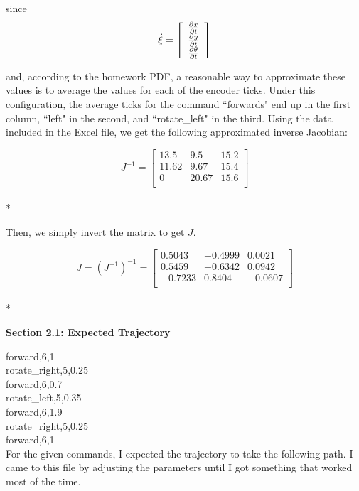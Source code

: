 \documentclass{article}
\begin{document}
since 
$$ \dot{\xi} = 
\left[\begin{array}{c}
\frac{\partial x}{\partial t} \\
\frac{\partial y}{\partial t} \\
\frac{\partial \theta}{\partial t} 
\end{array}\right] \\* 
$$

and, according to the homework PDF, a reasonable way to approximate these values is to average the values for each of the encoder ticks. Under this configuration, the average ticks for the command ``forwards" end up in the first column, ``left" in the second, and ``rotate\_left" in the third. Using the data included in the Excel file, we get the following approximated inverse Jacobian:

$$J^{-1} =
\left[\begin{array}{ccc}
13.5 & 9.5 & 15.2\\
11.62 & 9.67 & 15.4\\
0 & 20.67 & 15.6\\
\end{array}\right]$$ \\*

Then, we simply invert the matrix to get $J$.

\vspace{4mm}
$$J = (J^{-1})^{-1} =
\left[\begin{array}{ccc}
0.5043 & -0.4999 & 0.0021\\
0.5459 & -0.6342 & 0.0942\\
-0.7233 & 0.8404 & -0.0607\\
\end{array}\right]$$ \\*


\vspace{8mm}
\bf Section 2.1: Expected Trajectory \rm
\vspace{4mm}

forward,6,1\\
rotate\_right,5,0.25\\
forward,6,0.7\\
rotate\_left,5,0.35\\
forward,6,1.9\\
rotate\_right,5,0.25\\
forward,6,1\\

For the given commands, I expected the trajectory to take the following path. I came to this file by adjusting the parameters until I got something that worked most of the time.
\end{document}
